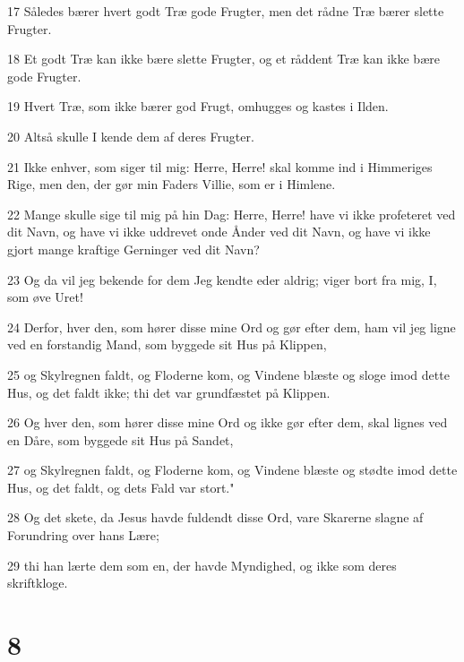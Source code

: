 \par 17 Således bærer hvert godt Træ gode Frugter, men det rådne Træ bærer slette Frugter.
\par 18 Et godt Træ kan ikke bære slette Frugter, og et råddent Træ kan ikke bære gode Frugter.
\par 19 Hvert Træ, som ikke bærer god Frugt, omhugges og kastes i Ilden.
\par 20 Altså skulle I kende dem af deres Frugter.
\par 21 Ikke enhver, som siger til mig: Herre, Herre! skal komme ind i Himmeriges Rige, men den, der gør min Faders Villie, som er i Himlene.
\par 22 Mange skulle sige til mig på hin Dag: Herre, Herre! have vi ikke profeteret ved dit Navn, og have vi ikke uddrevet onde Ånder ved dit Navn, og have vi ikke gjort mange kraftige Gerninger ved dit Navn?
\par 23 Og da vil jeg bekende for dem Jeg kendte eder aldrig; viger bort fra mig, I, som øve Uret!
\par 24 Derfor, hver den, som hører disse mine Ord og gør efter dem, ham vil jeg ligne ved en forstandig Mand, som byggede sit Hus på Klippen,
\par 25 og Skylregnen faldt, og Floderne kom, og Vindene blæste og sloge imod dette Hus, og det faldt ikke; thi det var grundfæstet på Klippen.
\par 26 Og hver den, som hører disse mine Ord og ikke gør efter dem, skal lignes ved en Dåre, som byggede sit Hus på Sandet,
\par 27 og Skylregnen faldt, og Floderne kom, og Vindene blæste og stødte imod dette Hus, og det faldt, og dets Fald var stort."
\par 28 Og det skete, da Jesus havde fuldendt disse Ord, vare Skarerne slagne af Forundring over hans Lære;
\par 29 thi han lærte dem som en, der havde Myndighed, og ikke som deres skriftkloge.

\chapter{8}

